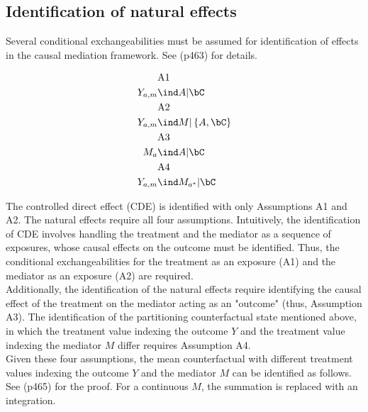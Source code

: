 \documentclass[10pt]{article}
\begin{document}
\subsection{Identification of natural effects}
\label{sec:org15ab44a}
Several conditional exchangeabilities must be assumed for identification of effects in the causal mediation framework. See \cite{vanderweeleExplanationCausalInference2015} (p463) for details.

\begin{align*}
  &\text{A1}\\
  Y_{a,m} &\ind A | \bC\\
  &\text{A2}\\
  Y_{a,m} &\ind M | \left\{ A, \bC \right\}\\
  &\text{A3}\\
  M_{a} &\ind A | \bC\\
  &\text{A4}\\
  Y_{a,m} &\ind M_{a^{*}} |\bC\\
\end{align*}

The controlled direct effect (CDE) is identified with only Assumptions A1 and A2. The natural effects require all four assumptions.  Intuitively, the identification of CDE involves handling the treatment and the mediator as a sequence of exposures, whose causal effects on the outcome must be identified. Thus, the conditional exchangeabilities for the treatment as an exposure (A1) and the mediator as an exposure (A2) are required.\\

Additionally, the identification of the natural effects require identifying the causal effect of the treatment on the mediator acting as an "outcome" (thus, Assumption A3). The identification of the partitioning counterfactual state mentioned above, in which the treatment value indexing the outcome \(Y\) and the treatment value indexing the mediator \(M\) differ requires Assumption A4.\\

Given these four assumptions, the mean counterfactual with different treatment values indexing the outcome \(Y\) and the mediator \(M\) can be identified as follows. See \cite{vanderweeleExplanationCausalInference2015} (p465) for the proof. For a continuous \(M\), the summation is replaced with an integration.
\end{document}
